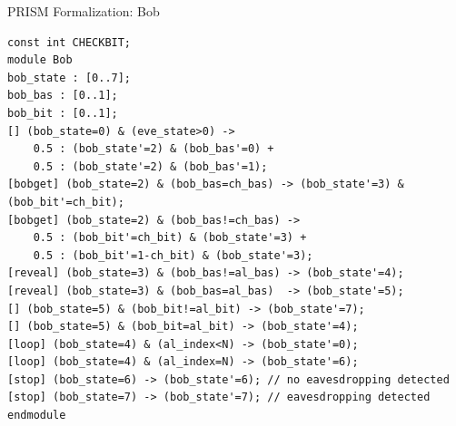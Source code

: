 \documentclass{beamer}
\begin{document}
\begin{frame}[fragile]{PRISM Formalization: Bob}
\begin{scriptsize}
\begin{verbatim}
const int CHECKBIT;
module Bob
bob_state : [0..7];
bob_bas : [0..1];
bob_bit : [0..1];
[] (bob_state=0) & (eve_state>0) -> 
    0.5 : (bob_state'=2) & (bob_bas'=0) +
    0.5 : (bob_state'=2) & (bob_bas'=1);
[bobget] (bob_state=2) & (bob_bas=ch_bas) -> (bob_state'=3) & (bob_bit'=ch_bit);
[bobget] (bob_state=2) & (bob_bas!=ch_bas) -> 
    0.5 : (bob_bit'=ch_bit) & (bob_state'=3) +
    0.5 : (bob_bit'=1-ch_bit) & (bob_state'=3);
[reveal] (bob_state=3) & (bob_bas!=al_bas) -> (bob_state'=4);
[reveal] (bob_state=3) & (bob_bas=al_bas)  -> (bob_state'=5);
[] (bob_state=5) & (bob_bit!=al_bit) -> (bob_state'=7);
[] (bob_state=5) & (bob_bit=al_bit) -> (bob_state'=4);
[loop] (bob_state=4) & (al_index<N) -> (bob_state'=0);
[loop] (bob_state=4) & (al_index=N) -> (bob_state'=6);
[stop] (bob_state=6) -> (bob_state'=6); // no eavesdropping detected
[stop] (bob_state=7) -> (bob_state'=7); // eavesdropping detected
endmodule
\end{verbatim}
\end{scriptsize}
\end{frame}


\end{document}
